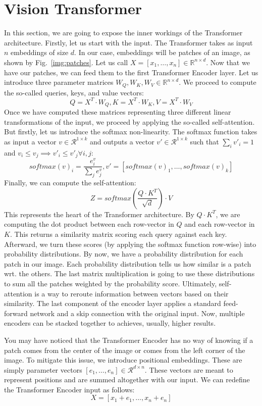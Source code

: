 \section{Vision Transformer}\label{sects:Transformer}
In this section, we are going to expose the inner workings of the Transformer architecture. Firstly, let us start with the input. The Transformer takes as input $n$ embeddings of size $d$. In our case, embeddings will be patches of an image, as shown by Fig.~\ref{img:patches}. Let us call $X = [x_1, \dots, x_n] \in \mathbb{R}^{n\times d}$. Now that we have our patches, we can feed them to the first Transformer Encoder layer. Let us introduce three parameter matrices $W_Q, W_K, W_V \in \mathbb{R}^{n\times d}$. We proceed to compute the so-called queries, keys, and value vectors:
\[Q = X^T\cdot W_Q, K = X^T\cdot W_K, V = X^T\cdot W_V\]
Once we have computed these matrices representing three different linear transformations of the input, we proceed by applying the so-called self-attention. But firstly, let us introduce the softmax non-linearity. The softmax function takes as input a vector $v \in \mathcal{R}^{1\times k}$ and outputs a vector $v' \in \mathcal{R}^{1\times k}$ such that $\sum_i v'_i = 1$ and $v_i \leq v_j \implies v'_i \leq v'_j \forall i,j$:
\[softmax(v)_i = \frac{e^v_i}{\sum_j{e^v_j}}, v'=[softmax(v)_1,\dots,softmax(v)_k]\]
Finally, we can compute the self-attention:
\[Z = softmax(\frac{Q\cdot K^T}{\sqrt{d}})\cdot V\]
This represents the heart of the Transformer architecture. By $Q \cdot K^T$, we are computing the dot product between each row-vector in $Q$ and each row-vector in $K$. This returns a similarity matrix scoring each query against each key. Afterward, we turn these scores (by applying the softmax function row-wise) into probability distributions. By now, we have a probability distribution for each patch in our image. Each probability distribution tells us how similar is a patch wrt. the others. The last matrix multiplication is going to use these distributions to sum all the patches weighted by the probability score. Ultimately, self-attention is a way to reroute information between vectors based on their similarity.
The last component of the encoder layer applies a standard feed-forward network and a skip connection with the original input. Now, multiple encoders can be stacked together to achieves, usually, higher results.

You may have noticed that the Transformer Encoder has no way of knowing if a patch comes from the center of the image or comes from the left corner of the image. To mitigate this issue, we introduce positional embeddings. These are simply parameter vectors $[e_1, \dots, e_n]\in\mathcal{R}^{d\times n}$. These vectors are meant to represent positions and are summed altogether with our input. We can redefine the Transformer Encoder input as follows:
\[X = [x_1+e_1,\dots,x_n+e_n]\]

